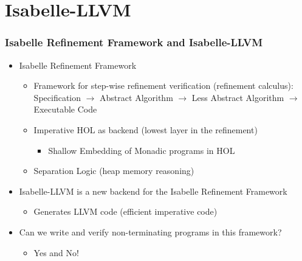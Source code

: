 \documentclass[aspectratio=169,10pt]{beamer}
\begin{document}
\section{Isabelle-LLVM}

\begin{frame}[fragile]
  \frametitle{Isabelle Refinement Framework and Isabelle-LLVM}
  \begin{itemize}
    \item Isabelle Refinement Framework
          \begin{itemize}
            \item Framework for step-wise refinement verification (refinement calculus): Specification $\rightarrow$ Abstract Algorithm $\rightarrow$ Less Abstract Algorithm $\rightarrow$ Executable Code
            \item Imperative HOL as backend (lowest layer in the refinement)
                  \begin{itemize}
                    \item Shallow Embedding of Monadic programs in HOL
                  \end{itemize}
            \item Separation Logic (heap memory reasoning)
          \end{itemize}
    \item Isabelle-LLVM is a new backend for the Isabelle Refinement Framework
          \begin{itemize}
            \item Generates LLVM code (efficient imperative code)
          \end{itemize}
          \pause
    \item Can we write and verify non-terminating programs in this framework?
          \pause
          \begin{itemize}
            \item Yes and No!
          \end{itemize}
  \end{itemize}
\end{frame}
\end{document}
